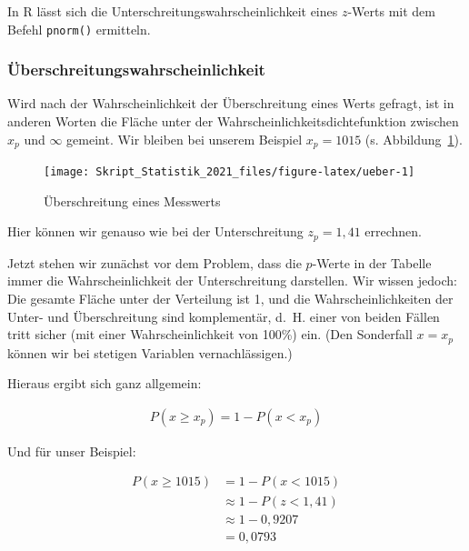 \documentclass[
  11pt,
  ngerman,
  a4paper,
]{report}
\newenvironment{rtip}{
  \medskip
  \begin{tcolorbox}[colframe=purple,colback=light_gray,title=Softwarehinweis]
}{
  \end{tcolorbox}
  \medskip
}
\begin{document}
\begin{rtip}
In R lässt sich die Unterschreitungswahrscheinlichkeit eines $z$-Werts mit dem Befehl \verb|pnorm()| ermitteln.
\end{rtip}

\hypertarget{uxfcberschreitungswahrscheinlichkeit}{%
\subsubsection{Überschreitungswahrscheinlichkeit}\label{uxfcberschreitungswahrscheinlichkeit}}

Wird nach der Wahrscheinlichkeit der Überschreitung eines Werts gefragt, ist in anderen Worten die Fläche unter der Wahrscheinlichkeitsdichtefunktion zwischen \(x_p\) und \(\infty\) gemeint. Wir bleiben bei unserem Beispiel \(x_p=1015\) (s. Abbildung~\ref{fig:ueber}).

\begin{figure}[!h]

{\centering \texttt{[image: Skript\_Statistik\_2021\_files/figure-latex/ueber-1]} 

}

\caption{Überschreitung eines Messwerts}\label{fig:ueber}
\end{figure}

Hier können wir genauso wie bei der Unterschreitung \(z_p=1{,}41\) errechnen.

Jetzt stehen wir zunächst vor dem Problem, dass die \(p\)-Werte in der Tabelle immer die Wahrscheinlichkeit der Unterschreitung darstellen. Wir wissen jedoch: Die gesamte Fläche unter der Verteilung ist 1, und die Wahrscheinlichkeiten der Unter- und Überschreitung sind komplementär, d.~H. einer von beiden Fällen tritt sicher (mit einer Wahrscheinlichkeit von 100\%) ein. (Den Sonderfall \(x=x_p\) können wir bei stetigen Variablen vernachlässigen.)

Hieraus ergibt sich ganz allgemein:

\[
  \begin{aligned}
    P(x \geq x_p) = 1-P(x<x_p)
  \end{aligned}
  \label{eq:ueber}
\]

Und für unser Beispiel:

\[
  \begin{aligned}
    P(x \geq 1015) &= 1-P(x < 1015) \\
    &\approx1-P(z < 1,41)\\
    &\approx1-0{,}9207\\
    &= 0{,}0793
  \end{aligned}
\]
\end{document}
